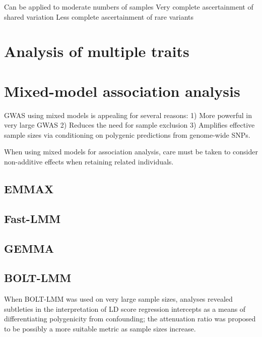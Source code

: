 \documentclass[
]{book}
\begin{document}
Can be applied to moderate numbers of samples
Very complete ascertainment of shared variation
Less complete ascertainment of rare variants

\hypertarget{analysis-of-multiple-traits}{%
\section{Analysis of multiple traits}\label{analysis-of-multiple-traits}}

\hypertarget{mixed-model-association-analysis}{%
\section{Mixed-model association analysis}\label{mixed-model-association-analysis}}

GWAS using mixed models is appealing for several reasons:
1) More powerful in very large GWAS
2) Reduces the need for sample exclusion
3) Amplifies effective sample sizes via conditioning on polygenic predictions from genome-wide SNPs.

When using mixed models for association analysis, care must be taken to consider non-additive effects when retaining related individuals.

\hypertarget{emmax}{%
\subsection{EMMAX}\label{emmax}}

\hypertarget{fast-lmm}{%
\subsection{Fast-LMM}\label{fast-lmm}}

\hypertarget{gemma}{%
\subsection{GEMMA}\label{gemma}}

\hypertarget{bolt-lmm}{%
\subsection{BOLT-LMM}\label{bolt-lmm}}

When BOLT-LMM was used on very large sample sizes, analyses revealed subtleties in the interpretation of LD score regression intercepts as a means of differentiating polygenicity from confounding; the attenuation ratio was proposed to be possibly a more suitable metric as sample sizes increase.
\end{document}
